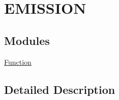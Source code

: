 \hypertarget{group___emission}{\section{E\+M\+I\+S\+S\+I\+O\+N}
\label{group___emission}
}
\subsection*{Modules}
\begin{DoxyCompactItemize}
\item 
\hyperlink{group___emission___function}{Function}
\end{DoxyCompactItemize}


\subsection{Detailed Description}
